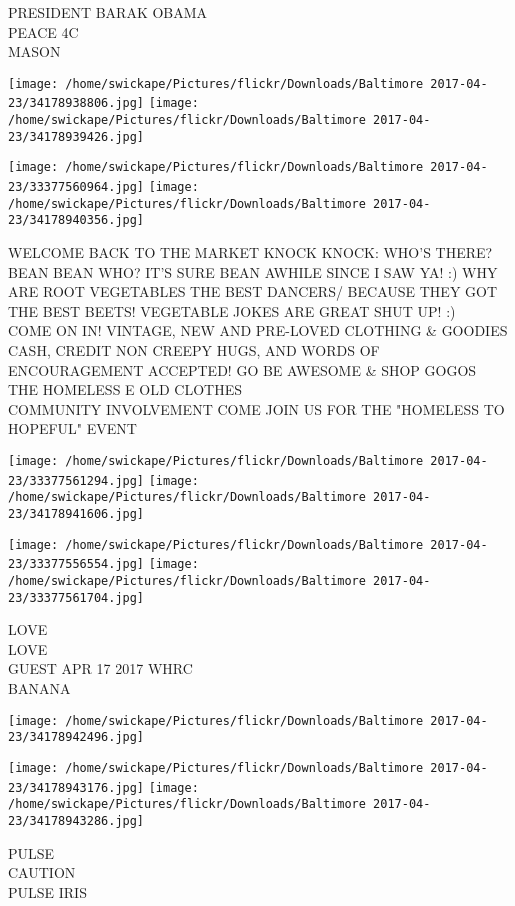 \documentclass[10pt,letterpaper]{article}
\begin{document}
PRESIDENT BARAK OBAMA\\
PEACE 4C\\
MASON
\pagebreak

\texttt{[image: /home/swickape/Pictures/flickr/Downloads/Baltimore 2017-04-23/34178938806.jpg]}
\texttt{[image: /home/swickape/Pictures/flickr/Downloads/Baltimore 2017-04-23/34178939426.jpg]}

\texttt{[image: /home/swickape/Pictures/flickr/Downloads/Baltimore 2017-04-23/33377560964.jpg]}
\texttt{[image: /home/swickape/Pictures/flickr/Downloads/Baltimore 2017-04-23/34178940356.jpg]}

WELCOME BACK TO THE MARKET KNOCK KNOCK: WHO'S THERE? BEAN BEAN WHO?  IT'S SURE BEAN AWHILE SINCE I SAW YA!  :) WHY ARE ROOT VEGETABLES THE BEST DANCERS/  BECAUSE THEY GOT THE BEST BEETS!  VEGETABLE JOKES ARE GREAT SHUT UP! :)\\
COME ON IN!  VINTAGE, NEW AND PRE{-}LOVED CLOTHING \& GOODIES CASH, CREDIT NON CREEPY HUGS, AND WORDS OF ENCOURAGEMENT ACCEPTED!  GO BE AWESOME \& SHOP GOGOS\\
THE HOMELESS E OLD CLOTHES\\
COMMUNITY INVOLVEMENT COME JOIN US FOR THE "HOMELESS TO HOPEFUL" EVENT
\pagebreak

\texttt{[image: /home/swickape/Pictures/flickr/Downloads/Baltimore 2017-04-23/33377561294.jpg]}
\texttt{[image: /home/swickape/Pictures/flickr/Downloads/Baltimore 2017-04-23/34178941606.jpg]}

\texttt{[image: /home/swickape/Pictures/flickr/Downloads/Baltimore 2017-04-23/33377556554.jpg]}
\texttt{[image: /home/swickape/Pictures/flickr/Downloads/Baltimore 2017-04-23/33377561704.jpg]}

LOVE\\
LOVE\\
GUEST APR 17 2017 WHRC\\
BANANA
\pagebreak

\texttt{[image: /home/swickape/Pictures/flickr/Downloads/Baltimore 2017-04-23/34178942496.jpg]}

\vspace{0.25in}
\texttt{[image: /home/swickape/Pictures/flickr/Downloads/Baltimore 2017-04-23/34178943176.jpg]}
\texttt{[image: /home/swickape/Pictures/flickr/Downloads/Baltimore 2017-04-23/34178943286.jpg]}

PULSE\\
CAUTION\\
PULSE IRIS
\pagebreak
\end{document}
